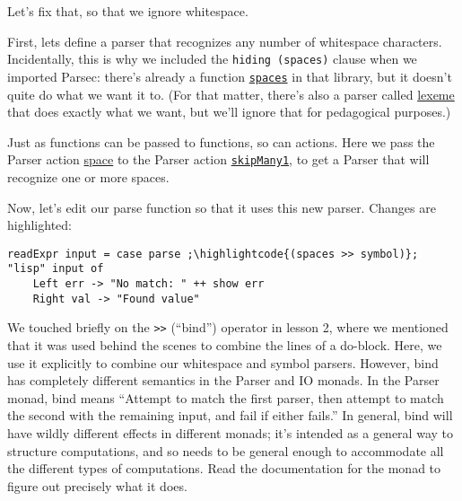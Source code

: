 Let's fix that, so that we ignore whitespace.
 
First, lets define a parser that recognizes any number of whitespace characters. Incidentally, this is why we included the \lstinline|hiding (spaces)| clause when we imported Parsec: there's already a function \href{http://www.cs.uu.nl/~daan/download/parsec/parsec.html\#spaces}{\texttt{spaces}} in that library, but it doesn't quite do what we want it to. (For that matter, there's also a parser called \href{http://www.cs.uu.nl/~daan/download/parsec/parsec.html\#lexeme}{lexeme} that does exactly what we want, but we'll ignore that for pedagogical purposes.)
 
 
Just as functions can be passed to functions, so can actions. Here we pass the Parser action \href{http://www.cs.uu.nl/~daan/download/parsec/parsec.html\#space}{space} to the Parser action \href{http://www.cs.uu.nl/~daan/download/parsec/parsec.html\#skipMany1}{\texttt{skipMany1}}, to get a Parser that will recognize one or more spaces.
 
Now, let's edit our parse function so that it uses this new parser. Changes are highlighted:
 
\begin{lstlisting}
readExpr input = case parse ;\highlightcode{(spaces >> symbol)}; "lisp" input of
    Left err -> "No match: " ++ show err
    Right val -> "Found value"
\end{lstlisting}
 
We touched briefly on the \verb|>>| (``bind'') operator in lesson 2, where we mentioned that it was used behind the scenes to combine the lines of a do-block. Here, we use it explicitly to combine our whitespace and symbol parsers. However, bind has completely different semantics in the Parser and IO monads. In the Parser monad, bind means ``Attempt to match the first parser, then attempt to match the second with the remaining input, and fail if either fails.'' In general, bind will have wildly different effects in different monads; it's intended as a general way to structure computations, and so needs to be general enough to accommodate all the different types of computations. Read the documentation for the monad to figure out precisely what it does.
 
